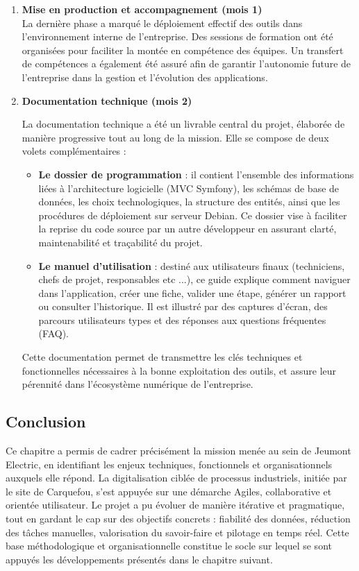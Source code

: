 \documentclass[11pt,a4paper]{article}
\begin{document}
\begin{enumerate}
    \item \textbf{Mise en production et accompagnement (mois 1)}\\
    La dernière phase a marqué le déploiement effectif des outils dans l’environnement interne de l’entreprise. Des sessions de formation ont été organisées pour faciliter la montée en compétence des équipes. Un transfert de compétences a également été assuré afin de garantir l’autonomie future de l’entreprise dans la gestion et l’évolution des applications.
    \item \textbf{Documentation technique (mois 2)} 
    
La documentation technique a été un livrable central du projet, élaborée de manière progressive tout au long de la mission. Elle se compose de deux volets complémentaires :

\begin{itemize}
    \item \textbf{Le dossier de programmation} : il contient l’ensemble des informations liées à l’architecture logicielle (MVC Symfony), les schémas de base de données, les choix technologiques, la structure des entités, ainsi que les procédures de déploiement sur serveur Debian. Ce dossier vise à faciliter la reprise du code source par un autre développeur en assurant clarté, maintenabilité et traçabilité du projet.
    
    \item \textbf{Le manuel d’utilisation} : destiné aux utilisateurs finaux (techniciens, chefs de projet, responsables etc ...), ce guide explique comment naviguer dans l’application, créer une fiche, valider une étape, générer un rapport ou consulter l’historique. Il est illustré par des captures d’écran, des parcours utilisateurs types et des réponses aux questions fréquentes (FAQ).
\end{itemize}

Cette documentation permet de transmettre les clés techniques et fonctionnelles nécessaires à la bonne exploitation des outils, et assure leur pérennité dans l’écosystème numérique de l’entreprise.
\end{enumerate}


\subsection{Conclusion}

Ce chapitre a permis de cadrer précisément la mission menée au sein de Jeumont Electric, en identifiant les enjeux techniques, fonctionnels et organisationnels auxquels elle répond. La digitalisation ciblée de processus industriels, initiée par le site de Carquefou, s’est appuyée sur une démarche Agiles, collaborative et orientée utilisateur. Le projet a pu évoluer de manière itérative et pragmatique, tout en gardant le cap sur des objectifs concrets : fiabilité des données, réduction des tâches manuelles, valorisation du savoir-faire et pilotage en temps réel. Cette base méthodologique et organisationnelle constitue le socle sur lequel se sont appuyés les développements présentés dans le chapitre suivant.
\end{document}
